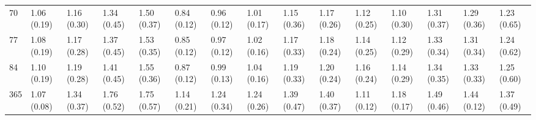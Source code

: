 \begin{tabular}{lllllllllllllll}
70  &  1.06 (0.19) &  1.16 (0.30) &   1.34 (0.45) &  1.50 (0.37) &  0.84 (0.12) &  0.96 (0.12) &  1.01 (0.17) &  1.15 (0.36) &  1.17 (0.26) &  1.12 (0.25) &  1.10 (0.30) &  1.31 (0.37) &  1.29 (0.36) &  1.23 (0.65) \\
77  &  1.08 (0.19) &  1.17 (0.28) &   1.37 (0.45) &  1.53 (0.35) &  0.85 (0.12) &  0.97 (0.12) &  1.02 (0.16) &  1.17 (0.33) &  1.18 (0.24) &  1.14 (0.25) &  1.12 (0.29) &  1.33 (0.34) &  1.31 (0.34) &  1.24 (0.62) \\
84  &  1.10 (0.19) &  1.19 (0.28) &   1.41 (0.45) &  1.55 (0.36) &  0.87 (0.12) &  0.99 (0.13) &  1.04 (0.16) &  1.19 (0.33) &  1.20 (0.24) &  1.16 (0.24) &  1.14 (0.29) &  1.34 (0.35) &  1.33 (0.33) &  1.25 (0.60) \\
365 &  1.07 (0.08) &  1.34 (0.37) &   1.76 (0.52) &  1.75 (0.57) &  1.14 (0.21) &  1.24 (0.34) &  1.24 (0.26) &  1.39 (0.47) &  1.40 (0.37) &  1.11 (0.12) &  1.18 (0.17) &  1.49 (0.46) &  1.44 (0.12) &  1.37 (0.49) \\
\bottomrule
\end{tabular}
